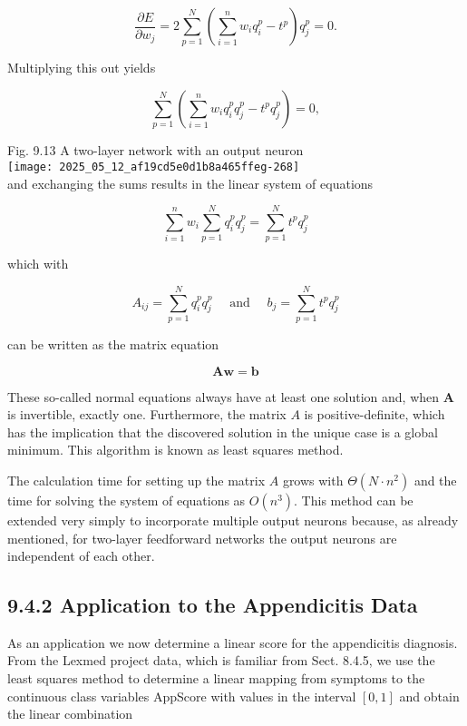 \documentclass[10pt]{article}
\begin{document}
$$
\frac{\partial E}{\partial w_{j}}=2 \sum_{p=1}^{N}\left(\sum_{i=1}^{n} w_{i} q_{i}^{p}-t^{p}\right) q_{j}^{p}=0 .
$$

Multiplying this out yields

$$
\sum_{p=1}^{N}\left(\sum_{i=1}^{n} w_{i} q_{i}^{p} q_{j}^{p}-t^{p} q_{j}^{p}\right)=0,
$$

Fig. 9.13 A two-layer network with an output neuron\\
\texttt{[image: 2025\_05\_12\_af19cd5e0d1b8a465ffeg-268]}\\
and exchanging the sums results in the linear system of equations

$$
\sum_{i=1}^{n} w_{i} \sum_{p=1}^{N} q_{i}^{p} q_{j}^{p}=\sum_{p=1}^{N} t^{p} q_{j}^{p}
$$

which with


\begin{equation*}
A_{i j}=\sum_{p=1}^{N} q_{i}^{p} q_{j}^{p} \quad \text { and } \quad b_{j}=\sum_{p=1}^{N} t^{p} q_{j}^{p} \tag{9.12}
\end{equation*}


can be written as the matrix equation


\begin{equation*}
\boldsymbol{A} \boldsymbol{w}=\boldsymbol{b} \tag{9.13}
\end{equation*}


These so-called normal equations always have at least one solution and, when $\boldsymbol{A}$ is invertible, exactly one. Furthermore, the matrix $A$ is positive-definite, which has the implication that the discovered solution in the unique case is a global minimum. This algorithm is known as least squares method.

The calculation time for setting up the matrix $A$ grows with $\Theta\left(N \cdot n^{2}\right)$ and the time for solving the system of equations as $O\left(n^{3}\right)$. This method can be extended very simply to incorporate multiple output neurons because, as already mentioned, for two-layer feedforward networks the output neurons are independent of each other.

\subsection*{9.4.2 Application to the Appendicitis Data}
As an application we now determine a linear score for the appendicitis diagnosis. From the Lexmed project data, which is familiar from Sect. 8.4.5, we use the least squares method to determine a linear mapping from symptoms to the continuous class variables AppScore with values in the interval $[0,1]$ and obtain the linear combination
\end{document}
